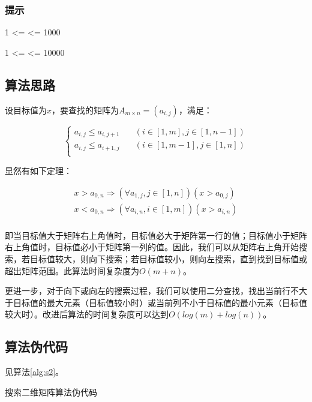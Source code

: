 


\subsubsection*{提示}
1 <=  <= 1000

1 <=  <= 10000

\subsection{算法思路}

设目标值为$x$，要查找的矩阵为$A_{m\times n}=(a_{i,j})$，满足：

$$
\left\{
\begin{aligned}
a_{i,j}\leq a_{i,j+1}&\quad (i\in[1,m],j\in[1,n-1])\\
a_{i,j}\leq a_{i+1,j}&\quad (i\in[1,m-1],j\in[1,n])\\
\end{aligned}
\right.
$$

显然有如下定理：

$$
\begin{aligned}
x>a_{0,n}\Rightarrow(\forall a_{1,j},j\in[1,n])(x>a_{0,j})\\
x<a_{0,n}\Rightarrow(\forall a_{i,n},i\in[1,m])(x>a_{i,n})\\
\end{aligned}
$$

即当目标值大于矩阵右上角值时，目标值必大于矩阵第一行的值；目标值小于矩阵右上角值时，目标值必小于矩阵第一列的值。因此，我们可以从矩阵右上角开始搜索，若目标值较大，则向下搜索；若目标值较小，则向左搜索，直到找到目标值或超出矩阵范围。此算法时间复杂度为$O(m+n)$。

更进一步，对于向下或向左的搜索过程，我们可以使用二分查找，找出当前行不大于目标值的最大元素（目标值较小时）或当前列不小于目标值的最小元素（目标值较大时）。改进后算法的时间复杂度可以达到$O(log(m)+log(n))$。

\subsection{算法伪代码}

见算法\ref{alg:s2}。
\begin{algorithm}[htbp]
\caption{搜索二维矩阵算法伪代码}\label{alg:s2}
\end{algorithm}